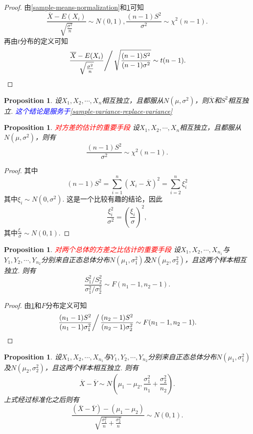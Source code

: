 \documentclass{article}
\newtheorem{proposition}[theorem]{Proposition}
\newcommand{\redt}[1]{\textcolor{red}{#1}}
\newcommand{\bluet}[1]{\textcolor{blue}{#1}}
\begin{document}
\begin{proof}
由\ref{sample-means-normalization}和\ref{sample-variance-and-variance}可知
$$
\frac{\overline{X}-E(X_i)}{\sqrt{\frac{\sigma^2}{n}}} \sim N(0,1),\frac{(n-1)S^2}{\sigma^2} \sim \chi^2(n-1).
$$
再由$t$分布的定义可知
$$
\left. \frac{\overline{X}-E(X_i)}{\sqrt{\frac{\sigma^2}{n}}} \right/ \sqrt{\frac{(n-1)S^2}{(n-1)\sigma^2}} \sim t(n-1).
$$
\end{proof}

\begin{proposition}
\rm 设$X_1,X_2,\cdots,X_n$相互独立，且都服从$N(\mu,\sigma^2)$，则$\overline{X}$和$S^2$相互独立. \bluet{这个结论是服务于\ref{sample-variance-replace-variance}}
\end{proposition}

\begin{proposition}\label{sample-variance-and-variance}
\rm \redt{对方差的估计的重要手段} 设$X_1,X_2,\cdots,X_n$相互独立，且都服从$N(\mu,\sigma^2)$，则有
$$
\frac{(n-1)S^2}{\sigma^2} \sim \chi^2(n-1). 
$$
\end{proposition}

\begin{proof}
\rm 其中
$$
(n-1)S^2 = \sum\limits_{i=1}^n (X_i-\overline{X})^2 = \sum\limits_{i=2}^n \xi_i^2 
$$
其中$\xi_i \sim N(0,\sigma^2)$. 这是一个比较有趣的结论，因此
$$
\frac{\xi_i^2}{\sigma^2} = \left(\frac{\xi_i}{\sigma}\right)^2,
$$
其中$\frac{\xi_i}{\sigma} \sim N(0,1)$. 
\end{proof}

\begin{proposition}
\rm \redt{对两个总体的方差之比估计的重要手段} 设$X_1,X_2,\cdots,X_{n_1}$与$Y_1,Y_2,\cdots,Y_{n_2}$分别来自正态总体分布$N(\mu_1,\sigma_1^2)$及$N(\mu_2,\sigma_2^2)$，且这两个样本相互独立. 则有
$$
\frac{S_1^2/S_2^2}{\sigma_1^2 / \sigma_2^2} \sim F(n_1 -1,n_2 -1). 
$$
\end{proposition}

\begin{proof}
由\ref{sample-variance-and-variance}和$F$分布定义可知
$$
\left. \frac{(n_1-1)S^2}{(n_1-1)\sigma_1^2} \right / \frac{(n_2-1)S^2}{(n_2-1)\sigma_2^2} \sim F(n_1-1,n_2-1).
$$
\end{proof}

\begin{proposition}\label{two-sample-mean-difference}
\rm 设$X_1,X_2,\cdots,X_{n_1}$与$Y_1,Y_2,\cdots,Y_{n_2}$分别来自正态总体分布$N(\mu_1,\sigma_1^2)$及$N(\mu_2,\sigma_2^2)$，且这两个样本相互独立. 则有
$$
\overline{X} - \overline{Y} \sim N(\mu_1 -\mu_2, \frac{\sigma_1^2}{n_1} + \frac{\sigma_2^2}{n_2}).
$$
上式经过标准化之后则有
$$
\frac{(\overline{X} - \overline{Y})-(\mu_1-\mu_2)}{\sqrt{\frac{\sigma_1^2}{n} + \frac{\sigma_2^2}{n}}} \sim N(0,1).
$$
\end{proposition}
\end{document}
